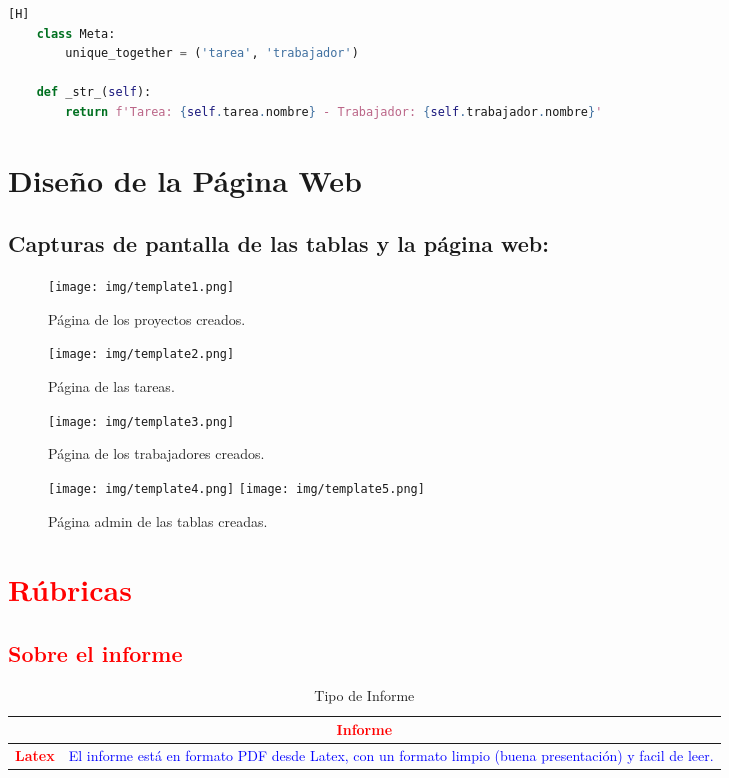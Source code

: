 \documentclass{article}
\begin{document}
\begin{itemize}
\begin{lstlisting}[language=Python,caption={models.py}][H]
    class Meta:
        unique_together = ('tarea', 'trabajador')

    def _str_(self):
        return f'Tarea: {self.tarea.nombre} - Trabajador: {self.trabajador.nombre}'
    \end{lstlisting}



\section{Diseño de la Página Web}
\subsection{Capturas de pantalla de las tablas y la página web:}

 \begin{figure}[h]
    \centering
    \texttt{[image: img/template1.png]}
    \caption{Página de los proyectos creados.}
\end{figure}

\begin{figure}[h]
    \centering
    \texttt{[image: img/template2.png]}
    \caption{Página de las tareas.}
\end{figure}

\begin{figure}[h]
    \centering
    \texttt{[image: img/template3.png]}
    \caption{Página de los trabajadores creados.}
\end{figure}

\begin{figure}[h]
    \centering
    \texttt{[image: img/template4.png]}
    \texttt{[image: img/template5.png]}
    \caption{Página admin de las tablas creadas.}
\end{figure}

\clearpage

\section{\textcolor{red}{Rúbricas}}
	
	\subsection{\textcolor{red}{Sobre el informe}}
	\begin{table}[H]
		\caption{Tipo de Informe}
		\setlength{\tabcolsep}{0.5em} %
		{\renewcommand{\arraystretch}{1.5}%
		\begin{tabular}{|p{3cm}|p{12cm}|}
			\hline
			\multicolumn{2}{|c|}{\textbf{\textcolor{red}{Informe}}}  \\
			\hline 
			\textbf{\textcolor{red}{Latex}} & \textcolor{blue}{El informe está en formato PDF desde Latex,  con un formato limpio (buena presentación) y facil de leer.}   \\ 
			\hline 
			

\end{tabular}}
\end{table}
\end{itemize}
\end{document}
